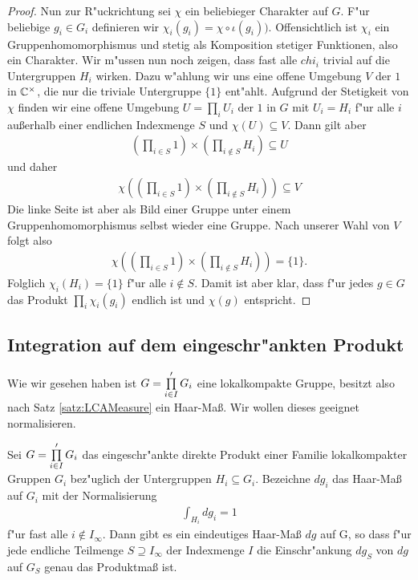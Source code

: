 \begin{proof}
			Nun zur R"uckrichtung sei $\chi$ ein beliebieger Charakter auf $G$. 
			F"ur beliebige $g_i \in G_i$ definieren wir $\chi_i (g_i) = \chi\circ\iota(g_i))$. 
			Offensichtlich ist $\chi_i$ ein Gruppenhomomorphismus und stetig als Komposition stetiger Funktionen, also ein Charakter. 
			Wir m"ussen nun noch zeigen, dass fast alle $chi_i$ trivial auf die Untergruppen $H_i$ wirken. 
			Dazu w"ahlung wir uns eine offene Umgebung $V$ der $1$ in $\mathbb{C}^\times$, die nur die triviale Untergruppe $\{1\}$ ent"ahlt. 
			Aufgrund der Stetigkeit von $\chi$ finden wir eine offene Umgebung $U=\prod_i U_i$ der $1$ in $G$ mit $U_i = H_i$ f"ur alle $i$ außerhalb einer endlichen Indexmenge $S$ und $\chi(U)\subseteq V$.
			Dann gilt aber
			\begin{align*}
				(\prod_{i \in S} 1) \times (\prod_{i \notin S} H_i) \subseteq U 
			\end{align*}
			und daher
			\begin{align*}
				\chi((\prod_{i \in S} 1) \times (\prod_{i \notin S} H_i)) \subseteq V 
			\end{align*}
			Die linke Seite ist aber als Bild einer Gruppe unter einem Gruppenhomomorphismus selbst wieder eine Gruppe. Nach unserer Wahl von $V$ folgt also
			\begin{align*}
				\chi((\prod_{i \in S} 1) \times (\prod_{i \notin S} H_i)) = \{1\}.
			\end{align*}
			Folglich $\chi_i (H_i) = \{1\}$ f"ur alle $i\notin S$. 
			Damit ist aber klar, dass f"ur jedes $g \in G$ das Produkt $\prod_i \chi_i(g_i)$ endlich ist und $\chi(g)$ entspricht.
		\end{proof}
	
	\subsection{Integration auf dem eingeschr"ankten Produkt}
		Wie wir gesehen haben ist $G=\prod\limits_{i \in I}' G_i$ eine lokalkompakte Gruppe, besitzt also nach Satz \ref{satz:LCAMeasure} ein Haar-Maß. Wir wollen dieses geeignet normalisieren.
		\begin{satz}
			Sei $G=\prod\limits_{i \in I}' G_i$ das eingeschr"ankte direkte Produkt einer Familie lokalkompakter Gruppen $G_i$ bez"uglich der Untergruppen $H_i \subseteq G_i$. Bezeichne $dg_i$ das Haar-Maß auf $G_i$ mit der Normalisierung
			\begin{align*}
				\int_{H_i} dg_i = 1
			\end{align*}
			f"ur fast alle $i \notin I_\infty$. Dann gibt es ein eindeutiges Haar-Maß $dg$ auf G, so dass f"ur jede endliche Teilmenge $S\supseteq I_\infty$ der Indexmenge $I$ die Einschr"ankung $dg_S$ von $dg$ auf $G_S$ genau das Produktmaß ist.
		\end{satz}
		
